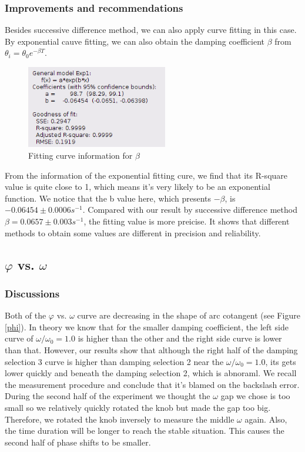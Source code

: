 \subsubsection{Improvements and recommendations}
    Besides successive difference method, we can also apply curve fitting in this case. By exponential cauve fitting, we can also obtain the damping coefficient $\beta$ from $\theta_i=\theta_0e^{-\beta T}$.
    \begin{figure}[H]
    \centering
        \includegraphics[width=0.55\textwidth]{images/fitting}
        \caption{Fitting curve information for $\beta$}\label{fitting}
    \end{figure}
    From the information of the exponential fitting cure, we find that its R-square value is quite close to 1, which means it's very likely to be an exponential function. We notice that the b value here, which presents $-\beta$, is $-0.06454\pm 0.0006s^{-1}$. Compared with our result by successive difference method $\beta=0.0657\pm 0.003s^{-1}$, the fitting value is more preicise. It shows that different methods to obtain some values are different in precision and reliability.

\subsection{$\varphi$ vs. $\omega$}
\subsubsection{Discussions}
    Both of the $\varphi$ vs. $\omega$ curve are decreasing in the shape of arc cotangent (see Figure \ref{phi}). In theory we know that for the smaller damping coefficient, the left side curve of $\omega/\omega_0=1.0$ is higher than the other and the right side curve is lower than that. However, our results show that although the right half of the damping selection 3 curve is higher than damping selection 2 near the $\omega/\omega_0=1.0$, its gets lower quickly and beneath the damping selection 2, which is abnoraml. We recall the measurement procedure and conclude that it's blamed on the backslash error. During the second half of the experiment we thought the $\omega$ gap we chose is too small so we relatively quickly rotated the knob but made the gap too big. Therefore, we rotated the knob inversely to measure the middle $\omega$ again. Also, the time duration will be longer to reach the stable situation. This causes the second half of phase shifts to be smaller.

